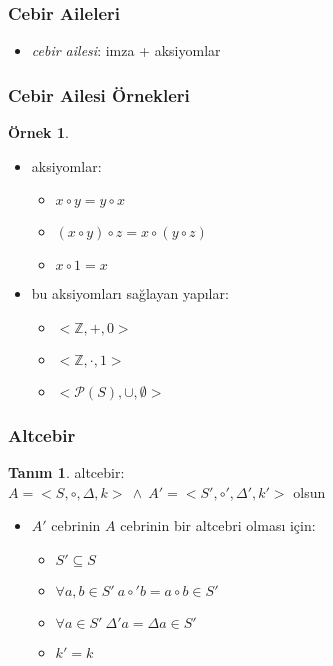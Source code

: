 \documentclass[dvipsnames]{beamer}
\theoremstyle{definition}
\newtheorem{tanim}[theorem]{Tanım}
\theoremstyle{example}
\newtheorem{ornek}[theorem]{Örnek}
\theoremstyle{plain}
\begin{document}
\begin{frame}
  \frametitle{Cebir Aileleri}

  \begin{itemize}
    \item \emph{cebir ailesi}: imza + aksiyomlar
  \end{itemize}
\end{frame}

\begin{frame}
  \frametitle{Cebir Ailesi Örnekleri}

  \begin{ornek}
    \begin{itemize}
      \item aksiyomlar:
      \begin{itemize}
        \item $x \circ y = y \circ x$
        \item $(x \circ y) \circ z = x \circ (y \circ z)$
        \item $x \circ 1 = x$
      \end{itemize}

      \pause
      \item bu aksiyomları sağlayan yapılar:
      \begin{itemize}
       \item $<\mathbb{Z},+,0>$
       \item $<\mathbb{Z},\cdot,1>$
       \item $<\mathcal{P}(S),\cup,\emptyset>$
      \end{itemize}
    \end{itemize}
  \end{ornek}
\end{frame}

\begin{frame}
  \frametitle{Altcebir}

  \begin{tanim}
    \alert{altcebir}:\\
    $A = <S,\circ,\Delta,k>~\wedge~A' = <S',\circ',\Delta',k'>$ olsun

    \pause
    \medskip
    \begin{itemize}
      \item $A'$ cebrinin $A$ cebrinin bir altcebri olması için:
      \begin{itemize}
        \item $S' \subseteq S$
        \item $\forall a,b \in S'~a \circ' b = a \circ b \in S'$
        \item $\forall a \in S'~\Delta' a = \Delta a \in S'$
        \item $k' = k$
      \end{itemize}
    \end{itemize}
  \end{tanim}
\end{frame}
\end{document}
